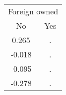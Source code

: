 \begin{tabular}{cc}
\toprule
\multicolumn{2}{c}{Foreign owned} \\
\cmidrule(lr){1-2}
No & Yes \\
\midrule
0.265 & . \\
-0.018 & . \\
-0.095 & . \\
-0.278 & . \\
\bottomrule
\end{tabular}
